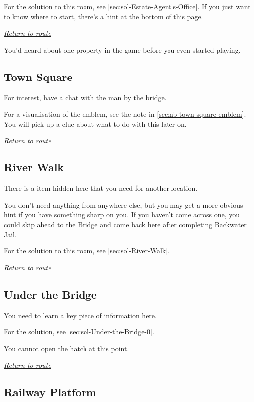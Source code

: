 \documentclass[a5paper]{extarticle}
\begin{document}
For the solution to this room, see \cref{sec:sol-Estate-Agent's-Office}.
If you just want to know where to start, there's a hint at the bottom of this page.

\hyperref[sec:route-1]{\emph{Return to route}}

\vfill
You'd heard about one property in the game before you even started playing.

\newpage
\subsection{Town Square}\label{sec:req-Town-Square-0}

For interest, have a chat with the man by the bridge.

For a visualisation of the emblem, see the note in \cref{sec:nb-town-square-emblem}.
You will pick up a clue about what to do with this later on.

\hyperref[sec:route-1]{\emph{Return to route}}

\newpage
\subsection{River Walk}\label{sec:req-River-Walk}

There is a item hidden here that you need for another location.

You don't need anything from anywhere else,
but you may get a more obvious hint if you have something sharp on you.
If you haven't come across one, you could skip ahead to the Bridge
and come back here after completing Backwater Jail.

For the solution to this room, see \cref{sec:sol-River-Walk}.

\hyperref[sec:route-1]{\emph{Return to route}}

\newpage
\subsection{Under the Bridge}\label{sec:req-Under-the-Bridge-0}

You need to learn a key piece of information here.

For the solution, see \cref{sec:sol-Under-the-Bridge-0}.

You cannot open the hatch at this point.

\hyperref[sec:route-1]{\emph{Return to route}}

\newpage
\subsection{Railway Platform}\label{sec:req-Railway-Platform}
\end{document}
